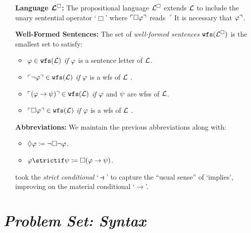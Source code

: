 \documentclass[a4paper, 11pt]{article} %
\begin{document}
\begin{enumerate}[leftmargin=1.2in]
	\item[\bf Language $\boldsymbol{\mathcal{L}^{\square}}$:] The propositional language $\mathcal{L}^{\square}$ extends $\mathcal{L}$ to include the unary sentential operator `$\Box$' where $\ulcorner\Box\varphi\urcorner$ reads $\ulcorner$It is necessary that $\varphi\urcorner$.
	\item[\bf Well-Formed Sentences:] The set of \textit{well-formed sentences} $\texttt{wfs}(\mathcal{L}^{\square})$ is the smallest set to satisfy:
	      \begin{itemize}\small
		      \item $\varphi \in \texttt{wfs}(\mathcal{L})$ \textit{if} $\varphi$ is a sentence letter of $\mathcal{L}$.
		      \item $\ulcorner\neg \varphi\urcorner \in \texttt{wfs}(\mathcal{L})$ \textit{if} $\varphi$ is a wfs of $\mathcal{L}$ .
		      \item $\ulcorner(\varphi \rightarrow \psi)\urcorner \in \texttt{wfs}(\mathcal{L})$ \textit{if} $\varphi$ and $\psi$ are wfss of $\mathcal{L}$.
		      \item $\ulcorner\Box \varphi\urcorner \in \texttt{wfs}(\mathcal{L})$ \textit{if} $\varphi$ is a wfs of $\mathcal{L}$ .
	      \end{itemize}
	\item[\bf Abbreviations:] We maintain the previous abbreviations along with:
	      \begin{itemize}\small
		      \item $\Diamond \varphi \coloneq \neg\Box\neg \varphi$.
		      \item $\metaA \strictif \metaB \coloneq \Box(\metaA \rightarrow \metaB)$.
	      \end{itemize}
	      \citet{Lewis1932} took the \textit{strict conditional} `$\strictif$' to capture the ``usual sense'' of `implies', improving on the material conditional `$\rightarrow$'.
\end{enumerate}



\section*{\it Problem Set: Syntax}
\end{document}
